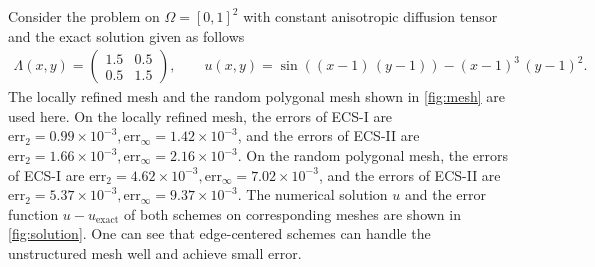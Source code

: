 \documentclass[times,review,preprint]{elsarticle}
\begin{document}
Consider the problem on $\Omega = [0,1]^2$ with constant anisotropic diffusion tensor and the exact solution given as follows
\begin{align*}
\Lambda(x,y) =
\left(
\begin{matrix}
1.5 & 0.5 \\
0.5 & 1.5
\end{matrix}
\right),
\qquad
u(x,y) = \sin((x-1) \, (y-1)) - (x-1)^3 \, (y-1)^2.
\end{align*}
The locally refined mesh and the random polygonal mesh shown in \cref{fig:mesh} are used here. On the locally refined mesh, the errors of ECS-I are $\text{err}_2 = 0.99 \times 10^{-3}, \text{err}_\infty = 1.42 \times 10^{-3}$, and the errors of ECS-II are $\text{err}_2 = 1.66 \times 10^{-3}, \text{err}_\infty = 2.16 \times 10^{-3}$. On the random polygonal mesh, the errors of ECS-I are $\text{err}_2 = 4.62 \times 10^{-3}, \text{err}_\infty = 7.02 \times 10^{-3}$, and the errors of ECS-II are $\text{err}_2 = 5.37 \times 10^{-3}, \text{err}_\infty = 9.37 \times 10^{-3}$.
The numerical solution $u$ and the error function $u - u_{\text{exact}}$ of both schemes on corresponding meshes are shown in \cref{fig:solution}. 
One can see that edge-centered schemes can handle the unstructured mesh well and achieve small error.
\end{document}
